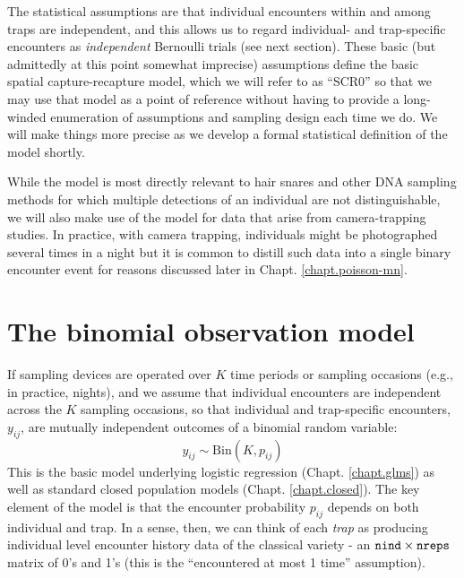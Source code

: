 The statistical assumptions are that individual encounters
within and among traps are independent, and this allows us to regard
individual- and trap-specific encounters as {\it independent} Bernoulli trials
(see next section).  These basic (but admittedly at this point
somewhat imprecise) assumptions define the basic spatial
capture-recapture model, which we will refer to as ``SCR0'' 
so that we may use that model as a point of reference without having
to provide a long-winded enumeration of assumptions and sampling
design each time we do. We will make things more precise as we develop
a formal statistical definition of the model shortly.

While the model is most directly relevant
to hair snares and other DNA sampling methods for which multiple
detections of an individual are not distinguishable,
we will also make use of the model for data that arise from
camera-trapping studies. In practice, with camera trapping,
individuals might be photographed several times in a night but it is
common to 
 distill such data into a single binary encounter event for
reasons discussed later in Chapt. \ref{chapt.poisson-mn}.


\section{The binomial observation model }

If sampling devices are operated over $K$ time periods or sampling
occasions (e.g., in practice,
nights), and we assume that individual encounters are independent
across the $K$ sampling occasions, so that   
 individual and trap-specific encounters, $y_{ij}$,
are mutually independent outcomes of a binomial random variable:
\begin{equation}
	y_{ij} \sim \mbox{Bin}(K, p_{ij})
\label{scr0.eq.bin}
\end{equation}
This is the basic model underlying logistic regression
(Chapt. \ref{chapt.glms}) as well as standard closed population models
(Chapt. \ref{chapt.closed}). The key element of the model is that the
encounter probability $p_{ij}$ depends on both individual and trap. In
a sense, then, we can think of each {\it trap} as producing individual
level encounter history data of the classical variety - an $\mbox{\tt
  nind} \times \mbox{\tt nreps}$ matrix of 0's and 1's (this is the
``encountered at most 1 time'' assumption).


